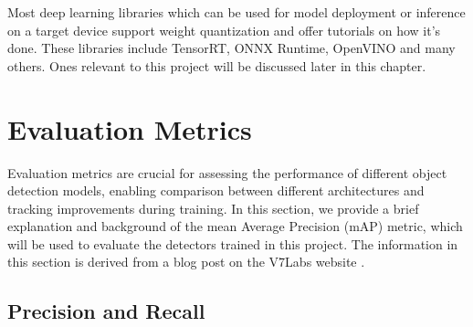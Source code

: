 


Most deep learning libraries which can be used for model deployment or inference
on a target device support weight quantization and offer tutorials on how it's
done. These libraries include TensorRT, ONNX Runtime, OpenVINO and many others.
Ones relevant to this project will be discussed later in this chapter.



\section{Evaluation Metrics}
\label{EvaluationMetrics}

Evaluation metrics are crucial for assessing the performance of different object
detection models, enabling comparison between different architectures and
tracking improvements during training. In this section, we provide a brief
explanation and background of the mean Average Precision (mAP) metric, which
will be used to evaluate the detectors trained in this project. The information
in this section is derived from a blog post on the V7Labs website \cite{mAP}.

\subsection*{Precision and Recall}

